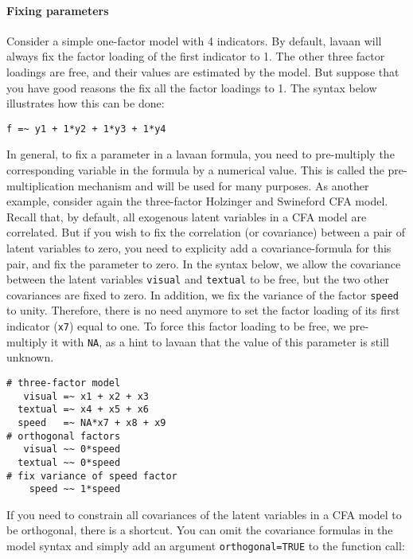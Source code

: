 \paragraph{Fixing parameters}

Consider a simple one-factor model with 4 indicators. By default, lavaan
will always fix the factor loading of the first indicator to 1. The
other three factor loadings are free, and their values are estimated by
the model. But suppose that you have good reasons the fix all the factor
loadings to 1. The syntax below illustrates how this can be done:

\begin{verbatim}
f =~ y1 + 1*y2 + 1*y3 + 1*y4
\end{verbatim}

In general, to fix a parameter in a lavaan formula, you need to
pre-multiply the corresponding variable in the formula by a numerical
value. This is called the pre-multiplication mechanism and will be used
for many purposes. As another example, consider again the three-factor
Holzinger and Swineford CFA model. Recall that, by default, all
exogenous latent variables in a CFA model are correlated. But if you
wish to fix the correlation (or covariance) between a pair of latent
variables to zero, you need to explicity add a covariance-formula for
this pair, and fix the parameter to zero. In the syntax below, we allow
the covariance between the latent variables \texttt{visual} and
\texttt{textual} to be free, but the two other covariances are fixed to
zero. In addition, we fix the variance of the factor \texttt{speed} to
unity. Therefore, there is no need anymore to set the factor loading of
its first indicator (\texttt{x7}) equal to one. To force this factor
loading to be free, we pre-multiply it with \texttt{NA}, as a hint to
lavaan that the value of this parameter is still unknown.

\begin{verbatim}
# three-factor model
   visual =~ x1 + x2 + x3
  textual =~ x4 + x5 + x6
  speed   =~ NA*x7 + x8 + x9
# orthogonal factors
   visual ~~ 0*speed
  textual ~~ 0*speed
# fix variance of speed factor
    speed ~~ 1*speed
\end{verbatim}

If you need to constrain all covariances of the latent variables in a
CFA model to be orthogonal, there is a shortcut. You can omit the
covariance formulas in the model syntax and simply add an argument
\texttt{orthogonal=TRUE} to the function call:

